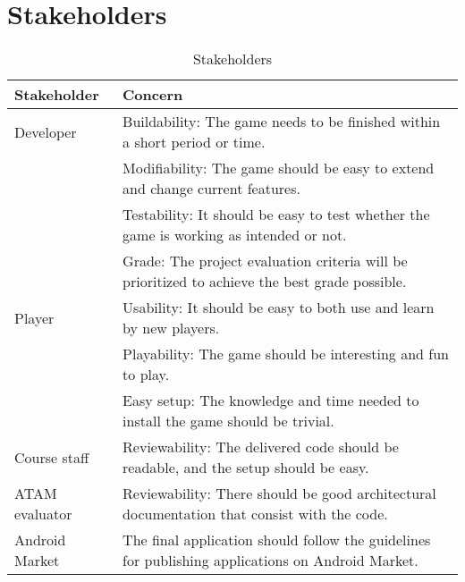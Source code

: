 \pagebreak
\section{Stakeholders}

\begin{table}[h!]
\begin{tabular}{ | p{90pt} | p{270pt}  |}
\hline
\bf Stakeholder &  \bf Concern  \\ \hline
Developer & Buildability: The game needs to be finished within a short period or time. \\
&  Modifiability: The game should be easy to extend and change current features. \\
& Testability: It should be easy to test whether the game is working as intended or not.\\
& Grade: The project evaluation criteria will be prioritized to achieve the best grade possible. \\ \hline 
Player & Usability: It should be easy to both use and learn by new players. \\
& Playability: The game should be interesting and fun to play. \\
& Easy setup: The knowledge and time needed to install the game should be trivial. \\ \hline
Course staff & Reviewability: The delivered code should be readable, and the setup should be easy. \\ \hline
ATAM evaluator & Reviewability: There should be good architectural documentation that consist with the code.  \\ \hline
Android Market & The final application should follow the guidelines for publishing applications on Android Market. \\ \hline
\end{tabular}

\caption{Stakeholders}

\end{table}




